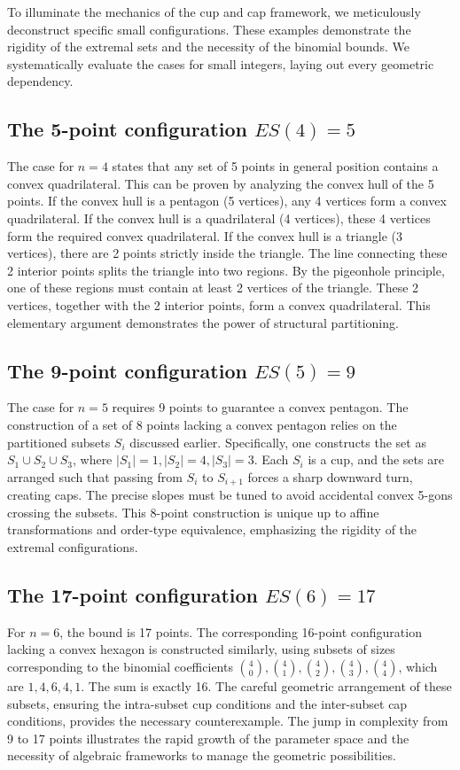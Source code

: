 \documentclass[11pt,a4paper]{article}
\begin{document}
To illuminate the mechanics of the cup and cap framework, we meticulously deconstruct specific small configurations. These examples demonstrate the rigidity of the extremal sets and the necessity of the binomial bounds. We systematically evaluate the cases for small integers, laying out every geometric dependency.

\subsection{The 5-point configuration $ES(4)=5$}
The case for $n=4$ states that any set of 5 points in general position contains a convex quadrilateral. This can be proven by analyzing the convex hull of the 5 points.
If the convex hull is a pentagon (5 vertices), any 4 vertices form a convex quadrilateral.
If the convex hull is a quadrilateral (4 vertices), these 4 vertices form the required convex quadrilateral.
If the convex hull is a triangle (3 vertices), there are 2 points strictly inside the triangle. The line connecting these 2 interior points splits the triangle into two regions. By the pigeonhole principle, one of these regions must contain at least 2 vertices of the triangle. These 2 vertices, together with the 2 interior points, form a convex quadrilateral.
This elementary argument demonstrates the power of structural partitioning.

\subsection{The 9-point configuration $ES(5)=9$}
The case for $n=5$ requires 9 points to guarantee a convex pentagon. The construction of a set of 8 points lacking a convex pentagon relies on the partitioned subsets $S_i$ discussed earlier.
Specifically, one constructs the set as $S_1 \cup S_2 \cup S_3$, where $|S_1|=1, |S_2|=4, |S_3|=3$.
Each $S_i$ is a cup, and the sets are arranged such that passing from $S_i$ to $S_{i+1}$ forces a sharp downward turn, creating caps. The precise slopes must be tuned to avoid accidental convex 5-gons crossing the subsets.
This 8-point construction is unique up to affine transformations and order-type equivalence, emphasizing the rigidity of the extremal configurations.

\subsection{The 17-point configuration $ES(6)=17$}
For $n=6$, the bound is 17 points. The corresponding 16-point configuration lacking a convex hexagon is constructed similarly, using subsets of sizes corresponding to the binomial coefficients $\binom{4}{0}, \binom{4}{1}, \binom{4}{2}, \binom{4}{3}, \binom{4}{4}$, which are $1, 4, 6, 4, 1$.
The sum is exactly 16. The careful geometric arrangement of these subsets, ensuring the intra-subset cup conditions and the inter-subset cap conditions, provides the necessary counterexample.
The jump in complexity from 9 to 17 points illustrates the rapid growth of the parameter space and the necessity of algebraic frameworks to manage the geometric possibilities.
\end{document}
